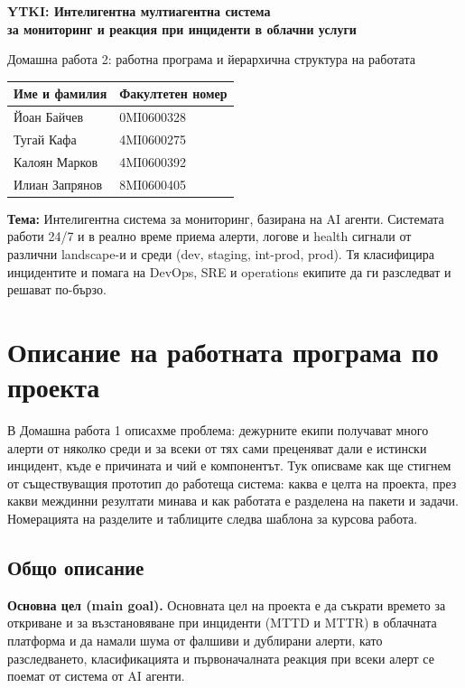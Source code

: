 \documentclass[11pt,a4paper]{article}
\begin{document}
\begin{center}
  {\Large\bfseries YTKI: Интелигентна мултиагентна система\\
  за мониторинг и реакция при инциденти в облачни услуги\par}
  \vspace{4pt}
  {\small Домашна работа 2: работна програма и йерархична структура на работата\par}
  \vspace{8pt}
  \begin{tabular}{ll}
    \toprule
    \textbf{Име и фамилия} & \textbf{Факултетен номер}\\
    \midrule
    Йоан Байчев    & 0MI0600328\\
    Тугай Кафа     & 4MI0600275\\
    Калоян Марков  & 4MI0600392\\
    Илиан Запрянов & 8MI0600405\\
    \bottomrule
  \end{tabular}
\end{center}

\textbf{Тема:} Интелигентна система за мониторинг, базирана на AI агенти. Системата работи 24/7 и в реално време приема алерти, логове и health сигнали от различни landscape-и и среди (dev, staging, int-prod, prod). Тя класифицира инцидентите и помага на DevOps, SRE и operations екипите да ги разследват и решават по-бързо.

\setcounter{section}{1}
\section{Описание на работната програма по проекта}

В Домашна работа 1 описахме проблема: дежурните екипи получават много алерти от няколко среди и за всеки от тях сами преценяват дали е истински инцидент, къде е причината и чий е компонентът. Тук описваме как ще стигнем от съществуващия прототип до работеща система: каква е целта на проекта, през какви междинни резултати минава и как работата е разделена на пакети и задачи. Номерацията на разделите и таблиците следва шаблона за курсова работа.

\subsection{Общо описание}

\textbf{Основна цел (main goal).} Основната цел на проекта е да съкрати времето за откриване и за възстановяване при инциденти (MTTD и MTTR) в облачната платформа и да намали шума от фалшиви и дублирани алерти, като разследването, класификацията и първоначалната реакция при всеки алерт се поемат от система от AI агенти.
\end{document}
